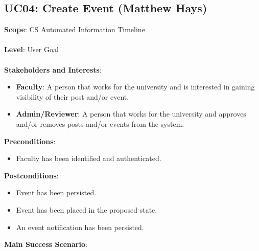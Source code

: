 \documentclass{article}
\begin{document}
\subsection{\textbf{UC04}: Create Event (Matthew Hays)}
\textbf{Scope}: CS Automated Information Timeline\\
\\
    \textbf{Level}: User Goal\\
    \\
    \textbf{Stakeholders and Interests}:
    \begin{itemize}[label={}]
         \item \textbf{Faculty}: A person that works for the university and is interested in gaining visibility of their post and/or event.
          \item \textbf{Admin/Reviewer}: A person that works for the university and approves and/or removes posts and/or events from the system. 
    \end{itemize}
    \textbf{Preconditions}:
    \begin{itemize}[label={}]
        \item Faculty has been identified and authenticated.
    \end{itemize}
    \textbf{Postconditions}:
        \begin{itemize}[label={}]
        \item Event has been persisted.
        \item Event has been placed in the proposed state.
        \item An event notification has been persisted.
    \end{itemize}
    \textbf{Main Success Scenario}:
\end{document}
